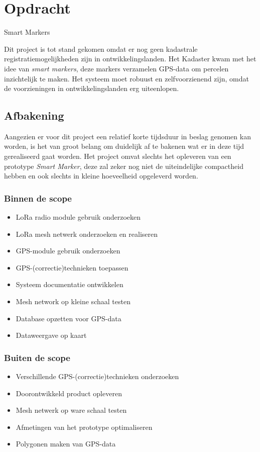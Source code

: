 \section{Opdracht}
\label{sec:opdracht}
Smart Markers

Dit project is tot stand gekomen omdat er nog geen kadastrale registratiemogelijkheden
zijn in ontwikkelingslanden. Het Kadaster kwam met het idee van \textit{smart markers},
deze markers verzamelen GPS-data om percelen inzichtelijk te maken. Het systeem moet
robuust en zelfvoorzienend zijn, omdat de voorzieningen in ontwikkelingslanden erg
uiteenlopen.

\subsection{Afbakening}
Aangezien er voor dit project een relatief korte tijdsduur in beslag genomen
kan worden, is het van groot belang om duidelijk af te bakenen wat er in deze
tijd gerealiseerd gaat worden.
Het project omvat slechts het opleveren van een prototype \textit{Smart Marker},
deze zal zeker nog niet de uiteindelijke compactheid hebben en ook slechts in
kleine hoeveelheid opgeleverd worden.

\subsubsection{Binnen de scope}
\begin{itemize}
    \item LoRa radio module gebruik onderzoeken
    \item LoRa mesh netwerk onderzoeken en realiseren
    \item GPS-module gebruik onderzoeken
    \item GPS-(correctie)technieken toepassen
    \item Systeem documentatie ontwikkelen
    \item Mesh network op kleine schaal testen
    \item Database opzetten voor GPS-data
    \item Dataweergave op kaart
\end{itemize}

\subsubsection{Buiten de scope}
\begin{itemize}
    \item Verschillende GPS-(correctie)technieken onderzoeken
    \item Doorontwikkeld product opleveren
    \item Mesh netwerk op ware schaal testen
    \item Afmetingen van het prototype optimaliseren
    \item Polygonen maken van GPS-data
\end{itemize}

